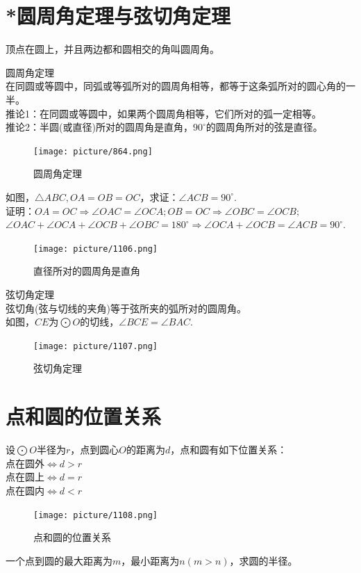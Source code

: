 \documentclass{ecnuthesis}
\begin{document}
\section{*圆周角定理与弦切角定理}
\begin{knowledge}
     顶点在圆上，并且两边都和圆相交的角叫圆周角。
\end{knowledge}
\begin{knowledge}
    圆周角定理 \\
    在同圆或等圆中，同弧或等弧所对的圆周角相等，都等于这条弧所对的圆心角的一半。\\
    推论1：在同圆或等圆中，如果两个圆周角相等，它们所对的弧一定相等。\\
    推论2：半圆(或直径)所对的圆周角是直角，$90^\circ$的圆周角所对的弦是直径。
\end{knowledge}
\begin{figure}[H]
\centering
\texttt{[image: picture/864.png]}
\caption{圆周角定理}
\end{figure}
\begin{knowledge}
    如图，$\triangle ABC,OA=OB=OC$，求证：$\angle ACB=90^\circ$. \\
    证明：$OA=OC \Rightarrow \angle OAC=\angle OCA;OB=OC \Rightarrow \angle OBC=\angle OCB;$ \\
    $\angle OAC+\angle OCA+\angle OCB+\angle OBC=180^\circ \Rightarrow \angle OCA+\angle OCB=\angle ACB=90^\circ$.
\end{knowledge}
\begin{figure}[H]
\centering
\texttt{[image: picture/1106.png]}
\caption{直径所对的圆周角是直角}
\end{figure}
\begin{knowledge}
    弦切角定理 \\
    弦切角(弦与切线的夹角)等于弦所夹的弧所对的圆周角。\\
    如图，$CE$为$\bigodot O$的切线，$\angle BCE = \angle BAC$.
\end{knowledge}
\begin{figure}[H]
\centering
\texttt{[image: picture/1107.png]}
\caption{弦切角定理}
\end{figure}
\clearpage
\section{点和圆的位置关系}
\begin{knowledge}
    设$\bigodot O$半径为$r$，点到圆心$O$的距离为$d$，点和圆有如下位置关系：\\
    点在圆外$\Leftrightarrow d > r$ \\
    点在圆上$\Leftrightarrow d = r$ \\
    点在圆内$\Leftrightarrow d < r$
\end{knowledge}
\begin{figure}[H]
\centering
\texttt{[image: picture/1108.png]}
\caption{点和圆的位置关系}
\end{figure}
\begin{problem}
    一个点到圆的最大距离为$m$，最小距离为$n(m>n)$，求圆的半径。
\end{problem}
\clearpage
\end{document}
